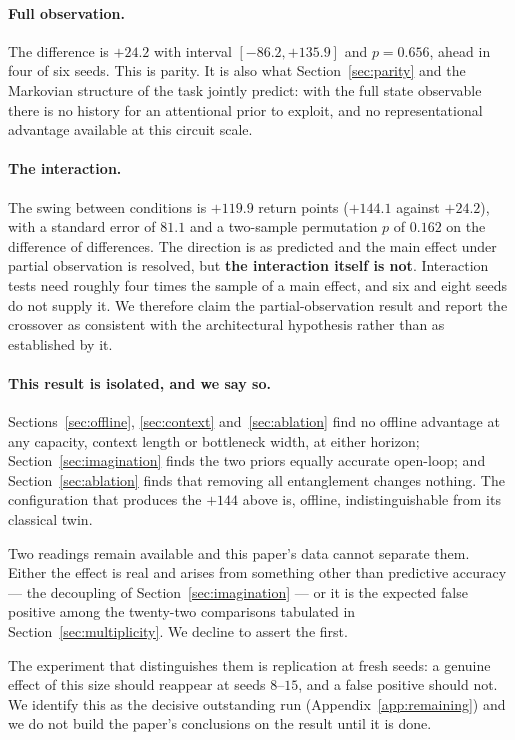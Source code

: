 \documentclass[11pt,onecolumn]{article}
\begin{document}
\paragraph{Full observation.}
The difference is $+24.2$ with interval $[-86.2, +135.9]$ and
$p = 0.656$, ahead in four of six seeds. This is parity. It is also what
Section~\ref{sec:parity} and the Markovian structure of the task
jointly predict: with the full state observable there is no history for
an attentional prior to exploit, and no representational advantage
available at this circuit scale.

\paragraph{The interaction.}
The swing between conditions is $+119.9$ return points
($+144.1$ against $+24.2$), with a standard error of $81.1$ and a
two-sample permutation $p$ of $0.162$ on the difference of differences.
The direction is as predicted and the main effect under partial
observation is resolved, but \textbf{the interaction itself is not}.
Interaction tests need roughly four times the sample of a main effect,
and six and eight seeds do not supply it. We therefore claim the
partial-observation result and report the crossover as consistent with
the architectural hypothesis rather than as established by it.

\paragraph{This result is isolated, and we say so.}
Sections~\ref{sec:offline}, \ref{sec:context} and~\ref{sec:ablation}
find no offline advantage at any capacity, context length or bottleneck
width, at either horizon; Section~\ref{sec:imagination} finds the two
priors equally accurate open-loop; and Section~\ref{sec:ablation} finds
that removing all entanglement changes nothing. The configuration that
produces the $+144$ above is, offline, indistinguishable from its
classical twin.

Two readings remain available and this paper's data cannot separate
them. Either the effect is real and arises from something other than
predictive accuracy --- the decoupling of
Section~\ref{sec:imagination} --- or it is the expected false positive
among the twenty-two comparisons tabulated in
Section~\ref{sec:multiplicity}. We decline to assert the first.

The experiment that distinguishes them is replication at fresh seeds: a
genuine effect of this size should reappear at seeds $8$--$15$, and a
false positive should not. We identify this as the decisive outstanding
run (Appendix~\ref{app:remaining}) and we do not build the paper's
conclusions on the result until it is done.
\end{document}
